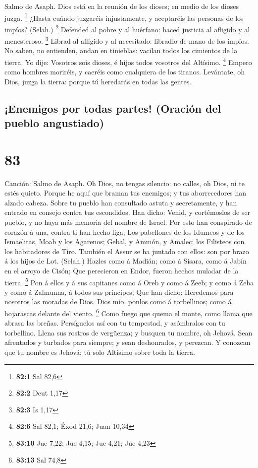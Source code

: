  Salmo de Asaph. Dios está en la reunión de los dioses; en
medio de los dioses juzga. \footnote{\textbf{82:1} Sal 82,6}
 ¿Hasta cuándo juzgaréis injustamente, y aceptaréis las
personas de los impíos? (Selah.) \footnote{\textbf{82:2} Deut 1,17}
 Defended al pobre y al huérfano: haced justicia al afligido
y al menesteroso. \footnote{\textbf{82:3} Is 1,17}  Librad
al afligido y al necesitado: libradlo de mano de los impíos.
 No saben, no entienden, andan en tinieblas: vacilan todos
los cimientos de la tierra.  Yo dije: Vosotros sois dioses,
é hijos todos vosotros del Altísimo. \footnote{\textbf{82:6} Sal 82,1;
  Éxod 21,6; Juan 10,34}  Empero como hombres moriréis, y
caeréis como cualquiera de los tiranos.  Levántate, oh Dios,
juzga la tierra: porque tú heredarás en todas las gentes.

\hypertarget{enemigos-por-todas-partes-oraciuxf3n-del-pueblo-angustiado}{%
\subsection{¡Enemigos por todas partes! (Oración del pueblo
angustiado)}\label{enemigos-por-todas-partes-oraciuxf3n-del-pueblo-angustiado}}

\hypertarget{section-82}{%
\section{83}\label{section-82}}

 Canción: Salmo de Asaph. Oh Dios, no tengas silencio: no
calles, oh Dios, ni te estés quieto.  Porque he aquí que
braman tus enemigos; y tus aborrecedores han alzado cabeza. 
Sobre tu pueblo han consultado astuta y secretamente, y han entrado en
consejo contra tus escondidos.  Han dicho: Venid, y
cortémoslos de ser pueblo, y no haya más memoria del nombre de Israel.
 Por esto han conspirado de corazón á una, contra ti han
hecho liga;  Los pabellones de los Idumeos y de los
Ismaelitas, Moab y los Agarenos;  Gebal, y Ammón, y Amalec;
los Filisteos con los habitadores de Tiro.  También el Assur
se ha juntado con ellos: son por brazo á los hijos de Lot. (Selah.)
 Hazles como á Madián; como á Sísara, como á Jabín en el
arroyo de Cisón;  Que perecieron en Endor, fueron hechos
muladar de la tierra. \footnote{\textbf{83:10} Jue 7,22; Jue 4,15; Jue
  4,21; Jue 4,23}  Pon á ellos y á sus capitanes como á
Oreb y como á Zeeb; y como á Zeba y como á Zalmunna, á todos sus
príncipes;  Que han dicho: Heredemos para nosotros las
moradas de Dios.  Dios mío, ponlos como á torbellinos; como
á hojarascas delante del viento. \footnote{\textbf{83:13} Sal 74,8}
 Como fuego que quema el monte, como llama que abrasa las
breñas.  Persíguelos así con tu tempestad, y asómbralos con
tu torbellino.  Llena sus rostros de vergüenza; y busquen
tu nombre, oh Jehová.  Sean afrentados y turbados para
siempre; y sean deshonrados, y perezcan.  Y conozcan que tu
nombre es Jehová; tú solo Altísimo sobre toda la tierra.

